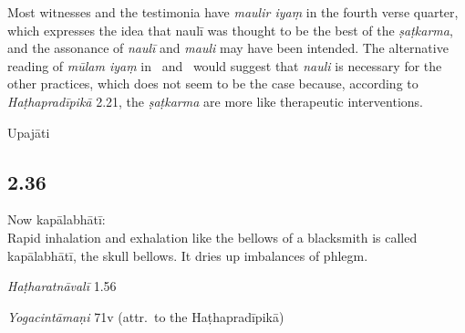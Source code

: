 \begin{ekdosis}
\begin{philcomm}[hp02_035]

Most witnesses and the testimonia have \emph{maulir iyaṃ} in the fourth verse quarter, which expresses the idea that naulī was thought to be the best of the \emph{ṣaṭkarma}, and the assonance of \emph{naulī} and \emph{mauli} may have been intended. The alternative reading of \emph{mūlam iyaṃ} in \etaOne\ and \epsilonOne\ would suggest that \emph{nauli} is necessary for the other practices, which does not seem to be the case because, according to \emph{Haṭhapradīpikā} 2.21, the \emph{ṣaṭkarma} are more like therapeutic interventions.
\end{philcomm}

\begin{metre}[hp02_035]
Upajāti
\end{metre}

\subsection*{2.36}
\begin{translation}[hp02_036]
Now kapālabhātī:\\
Rapid inhalation and exhalation like the bellows of a blacksmith is called kapālabhātī, the skull bellows. It dries up imbalances of phlegm.
\end{translation}


\begin{testimonia}[hp02_036]
\emph{Haṭharatnāvalī} 1.56

\begin{versinnote}
\end{versinnote}

\emph{Yogacintāmaṇi} 71v (attr.~to the Haṭhapradīpikā)

\begin{versinnote}
\end{versinnote}


\end{testimonia}
\end{ekdosis}
